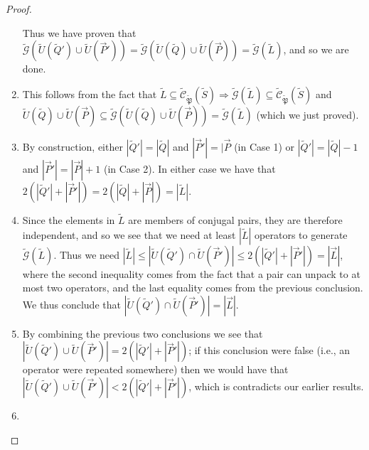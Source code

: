 \documentclass{amsbook}
\theoremstyle{plain}
\theoremstyle{definition}
\theoremstyle{remark}
\newcommand{\lst}{\vec}
\newcommand{\set}{\tilde}
\newcommand{\genfun}{\tilde{\mathcal{G}}}
\newcommand{\pauligroup}{{\set{\mathfrak{P}}}}
\newcommand{\centralizer}{\set{\mathcal{C}}}
\newcommand{\paren}[1]{\left(#1\right)}
\begin{document}
\begin{proof}
\begin{enumerate}
Thus we have proven that $\genfun\paren{\set U(\set Q')\cup\set U(\lst P')}=\genfun\paren{\set U(\set Q)\cup\set U(\lst P)}=\genfun(\set L)$, and so we are done.
\item

This follows from the fact that $\set L\subseteq\centralizer_\pauligroup(\set S)\Rightarrow\genfun(\set L)\subseteq\centralizer_\pauligroup(\set S)$ and $\set U(\set Q)\cup\set U(\lst P)\subseteq\genfun\paren{\set U(\set Q)\cup\set U(\lst P)}=\genfun(\set L)$ (which we just proved).
\item

By construction, either $|\set Q'|=|\set Q|$ and $|\lst P'|=|\lst P$ (in Case 1) or $|\set Q'|=|\set Q|-1$ and $|\lst P'|=|\lst P|+1$ (in Case 2).  In either case we have that $2(|\set Q'|+|\lst P'|)=2(|\set Q|+|\lst P|)=|\set L|$.
\item

Since the elements in $\set L$ are members of conjugal pairs, they are therefore independent, and so we see that we need at least $|\set L|$ operators to generate $\genfun(\set L)$.  Thus we need $|\set L|\le|\set U(\set Q')\cap\set U(\lst P')|\le 2(|\set Q'|+|\lst P'|)=|\lst L|$,  where the second inequality comes from the fact that a pair can unpack to at most two operators, and the last equality comes from the previous conclusion.  We thus conclude that $|\set U(\set Q')\cap\set U(\lst P')|=|\lst L|$.
\item

By combining the previous two conclusions we see that $|\set U(\set Q')\cup\set U(\lst P')|=2(|\set Q'|+|\lst P'|)$;  if this conclusion were false (i.e., an operator were repeated somewhere) then we would have that $|\set U(\set Q')\cup\set U(\lst P')|<2(|\set Q'|+|\lst P'|)$, which is contradicts our earlier results.
\item


\end{enumerate}
\end{proof}
\end{document}
